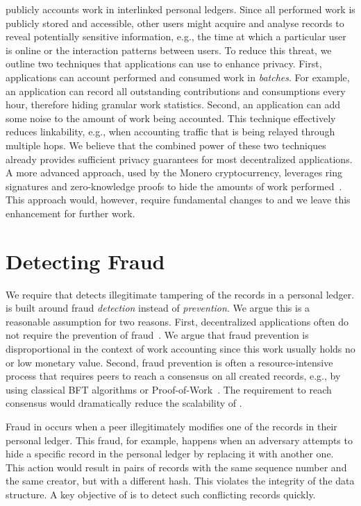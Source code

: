 \TrustChain{} publicly accounts work in interlinked personal ledgers.
Since all performed work is publicly stored and accessible, other users might acquire and analyse \TrustChain{} records to reveal potentially sensitive information, e.g., the time at which a particular user is online or the interaction patterns between users.
To reduce this threat, we outline two techniques that applications can use to enhance privacy.
First, applications can account performed and consumed work in \emph{batches}.
For example, an application can record all outstanding contributions and consumptions every hour, therefore hiding granular work statistics.
Second, an application can add some noise to the amount of work being accounted.
This technique effectively reduces linkability, e.g., when accounting traffic that is being relayed through multiple hops.
We believe that the combined power of these two techniques already provides sufficient privacy guarantees for most decentralized applications.
A more advanced approach, used by the Monero cryptocurrency, leverages ring signatures and zero-knowledge proofs to hide the amounts of work performed~\cite{bunz2018bulletproofs,poelstra2018confidential}.
This approach would, however, require fundamental changes to \TrustChain{} and we leave this enhancement for further work.

\section{Detecting Fraud}
\label{sec:detecting_fraud}
We require that \TrustChain{} detects illegitimate tampering of the records in a personal ledger.
\TrustChain{} is built around fraud \emph{detection} instead of \emph{prevention}.
We argue this is a reasonable assumption for two reasons.
First, decentralized applications often do not require the prevention of fraud~\cite{krishnan2002virtual}.
We argue that fraud prevention is disproportional in the context of work accounting since this work usually holds no or low monetary value.
Second, fraud prevention is often a resource-intensive process that requires peers to reach a consensus on all created records, e.g., by using classical BFT algorithms or Proof-of-Work~\cite{vukolic2015quest}.
The requirement to reach consensus would dramatically reduce the scalability of \TrustChain{}.

Fraud in \TrustChain{} occurs when a peer illegitimately modifies one of the records in their personal ledger.
This fraud, for example, happens when an adversary attempts to hide a specific record in the personal ledger by replacing it with another one.
This action would result in pairs of records with the same sequence number and the same creator, but with a different hash.
This violates the integrity of the \TrustChain{} data structure.
A key objective of \TrustChain{} is to detect such conflicting records quickly.

